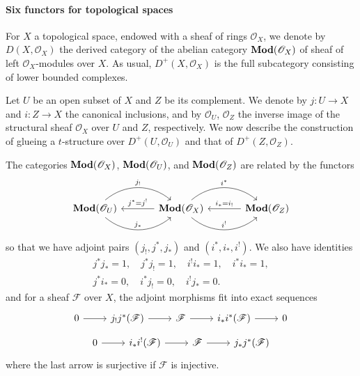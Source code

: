 \paragraph{Six functors for topological spaces}\label{triangle cat recollement topo space paragraph}
For $X$ a topological space, endowed with a sheaf of rings $\mathscr{O}_X$, we denote by $D(X,\mathscr{O}_X)$ the derived category of the abelian category $\mathbf{Mod}(\mathscr{O}_X)$ of sheaf of left $\mathscr{O}_X$-modules over $X$. As usual, $D^+(X,\mathscr{O}_X)$ is the full subcategory consisting of lower bounded complexes.\par
Let $U$ be an open subset of $X$ and $Z$ be its complement. We denote by $j:U\to X$ and $i:Z\to X$ the canonical inclusions, and by $\mathscr{O}_U$, $\mathscr{O}_Z$ the inverse image of the structural sheaf $\mathscr{O}_X$ over $U$ and $Z$, respectively. We now describe the construction of glueing a $t$-structure over $D^+(U,\mathscr{O}_U)$ and that of $D^+(Z,\mathscr{O}_Z)$.\par
The categories $\mathbf{Mod}(\mathscr{O}_X)$, $\mathbf{Mod}(\mathscr{O}_U)$, and $\mathbf{Mod}(\mathscr{O}_Z)$ are related by the functors
\[\begin{tikzcd}[column sep=12mm]
\Mod(\mathscr{O}_U)\ar[r,bend left=40pt,"j_!"]\ar[r,bend right=40pt,"j_*"]&\Mod(\mathscr{O}_X)\ar[l,swap,"j^*=j^!"]\ar[r,bend left=40pt,"i^*"]\ar[r,bend right=40pt,"i^!"]&\Mod(\mathscr{O}_Z)\ar[l,swap,"i_*=i_!"]
\end{tikzcd}\]
so that we have adjoint pairs $(j_!,j^*,j_*)$ and $(i^*,i_*,i^!)$. We also have identities
\begin{gather}
j^*j_*=1,\quad j^*j_!=1,\quad i^!i_*=1,\quad i^*i_*=1,\label{triangle cat recollement-1}\\
j^*i_*=0,\quad i^*j_!=0,\quad i^!j_*=0.\label{triangle cat recollement-2}
\end{gather}
and for a sheaf $\mathscr{F}$ over $X$, the adjoint morphisms fit into exact sequences
\begin{equation}\label{triangle cat recollement-3}
\begin{tikzcd}
0\ar[r]&j_!j^*(\mathscr{F})\ar[r]&\mathscr{F}\ar[r]&i_*i^*(\mathscr{F})\ar[r]&0
\end{tikzcd}
\end{equation}
\vspace*{-4mm}
\begin{equation}\label{triangle cat recollement-4}
\begin{tikzcd}
0\ar[r]&i_*i^!(\mathscr{F})\ar[r]&\mathscr{F}\ar[r]&j_*j^*(\mathscr{F})
\end{tikzcd}
\end{equation}
where the last arrow is surjective if $\mathscr{F}$ is injective.\par

